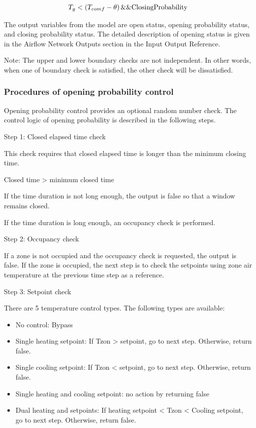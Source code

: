 \begin{equation}
T_g < \left(T_{comf} - \theta\right) \&\& \rm{ClosingProbability}
\end{equation}

The output variables from the model are open status, opening probability status, and closing probability status. The detailed description of opening status is given in the Airflow Network Outputs section in the Input Output Reference.

Note: The upper and lower boundary checks are not independent. In other words, when one of boundary check is satisfied, the other check will be dissatisfied.

\subsubsection{Procedures of opening probability control}\label{procedures-of-opening-probability-control}

Opening probability control provides an optional random number check. The control logic of opening probability is described in the following steps.

Step 1: Closed elapsed time check

This check requires that closed elapsed time is longer than the minimum closing time.

Closed time \textgreater{} minimum closed time

If the time duration is not long enough, the output is false so that a window remains closed.

If the time duration is long enough, an occupancy check is performed.

Step 2: Occupancy check

If a zone is not occupied and the occupancy check is requested, the output is false. If the zone is occupied, the next step is to check the setpoints using zone air temperature at the previous time step as a reference.

Step 3: Setpoint check

There are 5 temperature control types. The following types are available:

\begin{itemize}
\item
  No control: Bypass
\item
  Single heating setpoint: If Tzon \textgreater{} setpoint, go to next step. Otherwise, return false.
\item
  Single cooling setpoint: If Tzon \textless{} setpoint, go to next step. Otherwise, return false.
\item
  Single heating and cooling setpoint: no action by returning false
\item
  Dual heating and setpoints: If heating setpoint \textless{} Tzon \textless{} Cooling setpoint, go to next step. Otherwise, return false.
\end{itemize}

